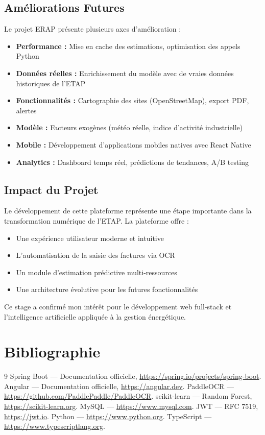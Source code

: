 \documentclass[12pt,a4paper]{article}
\begin{document}
\subsection{Améliorations Futures}
Le projet ERAP présente plusieurs axes d'amélioration :

\begin{itemize}
    \item \textbf{Performance :} Mise en cache des estimations, optimisation des appels Python
    \item \textbf{Données réelles :} Enrichissement du modèle avec de vraies données historiques de l'ETAP
    \item \textbf{Fonctionnalités :} Cartographie des sites (OpenStreetMap), export PDF, alertes
    \item \textbf{Modèle :} Facteurs exogènes (météo réelle, indice d'activité industrielle)
    \item \textbf{Mobile :} Développement d'applications mobiles natives avec React Native
    \item \textbf{Analytics :} Dashboard temps réel, prédictions de tendances, A/B testing
\end{itemize}

\subsection{Impact du Projet}
Le développement de cette plateforme représente une étape importante dans la transformation numérique de l'ETAP. La plateforme offre :

\begin{itemize}
    \item Une expérience utilisateur moderne et intuitive
    \item L'automatisation de la saisie des factures via OCR
    \item Un module d'estimation prédictive multi-ressources
    \item Une architecture évolutive pour les futures fonctionnalités
\end{itemize}

Ce stage a confirmé mon intérêt pour le développement web full-stack et l'intelligence artificielle appliquée à la gestion énergétique.

\section*{Bibliographie}
\begin{thebibliography}{9}
 Spring Boot --- Documentation officielle, \url{https://spring.io/projects/spring-boot}.
 Angular --- Documentation officielle, \url{https://angular.dev}.
 PaddleOCR --- \url{https://github.com/PaddlePaddle/PaddleOCR}.
 scikit-learn --- Random Forest, \url{https://scikit-learn.org}.
 MySQL --- \url{https://www.mysql.com}.
 JWT --- RFC 7519, \url{https://jwt.io}.
 Python --- \url{https://www.python.org}.
 TypeScript --- \url{https://www.typescriptlang.org}.
\end{thebibliography}
\end{document}

